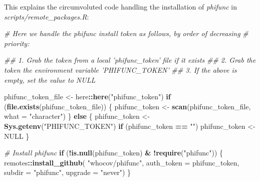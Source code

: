 \documentclass[]{book}
\newenvironment{Shaded}{\begin{snugshade}}{\end{snugshade}}
\newcommand{\CommentTok}[1]{\textcolor[rgb]{0.56,0.35,0.01}{\textit{#1}}}
\newcommand{\ControlFlowTok}[1]{\textcolor[rgb]{0.13,0.29,0.53}{\textbf{#1}}}
\newcommand{\DataTypeTok}[1]{\textcolor[rgb]{0.13,0.29,0.53}{#1}}
\newcommand{\KeywordTok}[1]{\textcolor[rgb]{0.13,0.29,0.53}{\textbf{#1}}}
\newcommand{\NormalTok}[1]{#1}
\newcommand{\OperatorTok}[1]{\textcolor[rgb]{0.81,0.36,0.00}{\textbf{#1}}}
\newcommand{\OtherTok}[1]{\textcolor[rgb]{0.56,0.35,0.01}{#1}}
\newcommand{\StringTok}[1]{\textcolor[rgb]{0.31,0.60,0.02}{#1}}
\begin{document}
This explains the circumvoluted code handling the installation of \emph{phifunc} in
\emph{scripts/remote\_packages.R}:

\begin{Shaded}
\begin{Highlighting}[]

\CommentTok{# Here we handle the phifunc install token as follows, by order of decreasing}
\CommentTok{# priority:}

\CommentTok{## 1. Grab the token from a local 'phifunc_token' file if it exists}
\CommentTok{## 2. Grab the token the environment variable 'PHIFUNC_TOKEN'}
\CommentTok{## 3. If the above is empty, set the value to NULL}

\NormalTok{phifunc_token_file <-}\StringTok{ }\NormalTok{here}\OperatorTok{::}\KeywordTok{here}\NormalTok{(}\StringTok{"phifunc_token"}\NormalTok{)}
\ControlFlowTok{if}\NormalTok{ (}\KeywordTok{file.exists}\NormalTok{(phifunc_token_file)) \{}
\NormalTok{  phifunc_token <-}\StringTok{ }\KeywordTok{scan}\NormalTok{(phifunc_token_file, }\DataTypeTok{what =} \StringTok{"character"}\NormalTok{)}
\NormalTok{\} }\ControlFlowTok{else}\NormalTok{ \{}
\NormalTok{  phifunc_token <-}\StringTok{ }\KeywordTok{Sys.getenv}\NormalTok{(}\StringTok{"PHIFUNC_TOKEN"}\NormalTok{)}
  \ControlFlowTok{if}\NormalTok{ (phifunc_token }\OperatorTok{==}\StringTok{ ""}\NormalTok{) phifunc_token <-}\StringTok{ }\OtherTok{NULL}
\NormalTok{\}}

\CommentTok{# Install phifunc}
\ControlFlowTok{if}\NormalTok{ (}\OperatorTok{!}\KeywordTok{is.null}\NormalTok{(phifunc_token) }\OperatorTok{&}\StringTok{ }\OperatorTok{!}\KeywordTok{require}\NormalTok{(}\StringTok{"phifunc"}\NormalTok{)) \{}
\NormalTok{  remotes}\OperatorTok{::}\KeywordTok{install_github}\NormalTok{(}
    \StringTok{"whocov/phifunc"}\NormalTok{,}
    \DataTypeTok{auth_token =}\NormalTok{ phifunc_token,}
    \DataTypeTok{subdir =} \StringTok{"phifunc"}\NormalTok{, }\DataTypeTok{upgrade =} \StringTok{"never"}\NormalTok{)}
\NormalTok{\}}
\end{Highlighting}
\end{Shaded}


\end{document}
